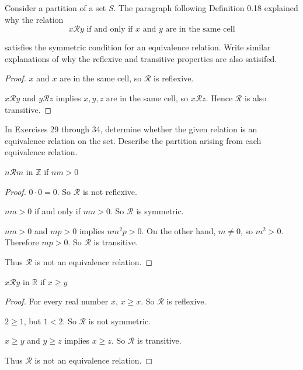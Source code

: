 \begin{exercise}
    Consider a partition of a set $S$. The paragraph following Definition 0.18 explained why the relation
    \[
        x\mathscr{R}y \text{\ if and only if $x$ and $y$ are in the same cell}
    \]

    satisfies the symmetric condition for an equivalence relation. Write similar explanations of why the reflexive and transitive properties are also satisifed.
\end{exercise}

\begin{proof}
    $x$ and $x$ are in the same cell, so $\mathscr{R}$ is reflexive.

    $x\mathscr{R}y$ and $y\mathscr{R}z$ implies $x, y, z$ are in the same cell, so $x\mathscr{R}z$. Hence $\mathscr{R}$ is also transitive.
\end{proof}

In Exercises 29 through 34, determine whether the given relation is an equivalence relation on the set. Describe the partition arising from each equivalence relation.

\begin{exercise}
    $n\mathscr{R}m$ in $\mathbb{Z}$ if $nm > 0$
\end{exercise}

\begin{proof}
    $0\cdot 0 = 0$. So $\mathscr{R}$ is not reflexive.

    $nm > 0$ if and only if $mn > 0$. So $\mathscr{R}$ is symmetric.

    $nm > 0$ and $mp > 0$ implies $n{m}^{2}p > 0$. On the other hand, $m\ne 0$, so $m^{2} > 0$. Therefore $mp > 0$. So $\mathscr{R}$ is transitive.

    Thus $\mathscr{R}$ is not an equivalence relation.
\end{proof}

\begin{exercise}
    $x\mathscr{R}y$ in $\mathbb{R}$ if $x\ge y$
\end{exercise}

\begin{proof}
    For every real number $x$, $x\ge x$. So $\mathscr{R}$ is reflexive.

    $2\ge 1$, but $1 < 2$. So $\mathscr{R}$ is not symmetric.

    $x\ge y$ and $y\ge z$ implies $x\ge z$. So $\mathscr{R}$ is transitive.

    Thus $\mathscr{R}$ is not an equivalence relation.
\end{proof}

